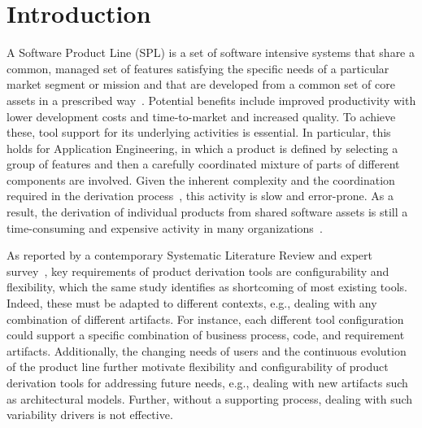 \section{Introduction}
\label{introduction}

A Software Product Line (SPL) is a set of software intensive systems that share a common, managed set of features satisfying the specific needs of a particular market segment or mission and that are developed from a common set of core assets in a prescribed way~\cite{spl-book}. Potential benefits include improved productivity with lower development costs and time-to-market and increased quality. To achieve these, tool support for its underlying activities is essential. In particular, this holds for Application Engineering, in which a product is defined by selecting a group of features and then a carefully coordinated mixture of parts of different components are involved. Given the inherent complexity and the coordination required in the derivation process~\cite{griss}, this activity is slow and error-prone. As a result, the derivation of individual products from shared software assets is still a time-consuming and expensive activity in many organizations~\cite{deelstra:2005}.



As reported by a contemporary Systematic Literature Review and expert survey~\cite{ist-2010},  key requirements of product derivation tools are configurability and flexibility, which the same study identifies as shortcoming of most existing tools. Indeed, these must be adapted to different contexts, e.g., dealing with any combination of different artifacts. For instance, each different tool configuration could support a specific combination of business process, code, and requirement artifacts. Additionally, the changing needs of users and the continuous evolution of the product line further motivate flexibility and configurability of product derivation tools for addressing future needs, e.g., dealing with new artifacts such as architectural models. Further, without a supporting process, dealing with such variability drivers is not effective.

